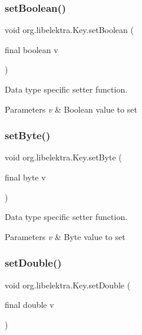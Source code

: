 \subsubsection{\texorpdfstring{set\+Boolean()}{setBoolean()}}
{\footnotesize\ttfamily void org.\+libelektra.\+Key.\+set\+Boolean (\begin{DoxyParamCaption}\item[{final boolean}]{v }\end{DoxyParamCaption})\hspace{0.3cm}{\ttfamily [inline]}}



Data type specific setter function. 


\begin{DoxyParams}{Parameters}
{\em v} & Boolean value to set \\
\hline
\end{DoxyParams}
\mbox{\label{classorg_1_1libelektra_1_1Key_ab9576c2e1e526ee23904a50b02386b45}} 
\subsubsection{\texorpdfstring{set\+Byte()}{setByte()}}
{\footnotesize\ttfamily void org.\+libelektra.\+Key.\+set\+Byte (\begin{DoxyParamCaption}\item[{final byte}]{v }\end{DoxyParamCaption})\hspace{0.3cm}{\ttfamily [inline]}}



Data type specific setter function. 


\begin{DoxyParams}{Parameters}
{\em v} & Byte value to set \\
\hline
\end{DoxyParams}
\mbox{\label{classorg_1_1libelektra_1_1Key_a2c411133e9a8d13df30d08041678a5a0}} 
\subsubsection{\texorpdfstring{set\+Double()}{setDouble()}}
{\footnotesize\ttfamily void org.\+libelektra.\+Key.\+set\+Double (\begin{DoxyParamCaption}\item[{final double}]{v }\end{DoxyParamCaption})\hspace{0.3cm}{\ttfamily [inline]}}



